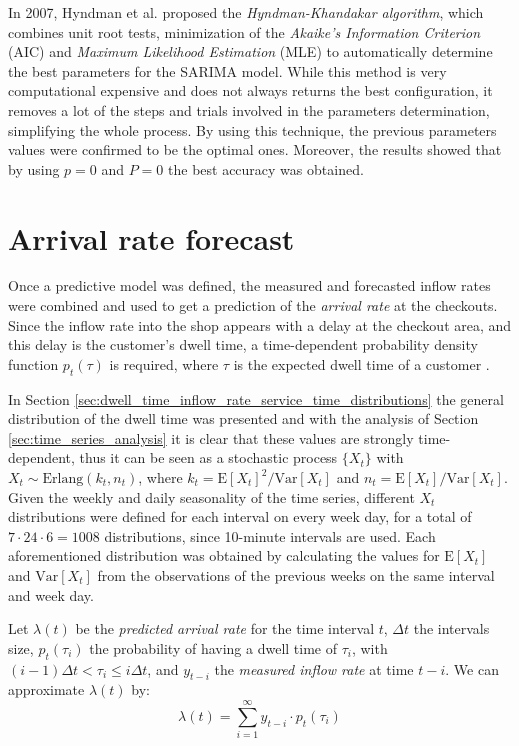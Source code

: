 In 2007, Hyndman et al. \cite{hyndman2007} proposed the \emph{Hyndman-Khandakar algorithm}, which combines unit root tests, minimization of the \emph{Akaike’s Information Criterion} (AIC) and \emph{Maximum Likelihood Estimation} (MLE) to automatically determine the best parameters for the SARIMA model. While this method is very computational expensive and does not always returns the best configuration, it removes a lot of the steps and trials involved in the parameters determination, simplifying the whole process. By using this technique, the previous parameters values were confirmed to be the optimal ones. Moreover, the results showed that by using \( p = 0 \) and \( P = 0 \) the best accuracy was obtained.

\section{Arrival rate forecast}
\label{sec:arrival_rate_forecast}

Once a predictive model was defined, the measured and forecasted inflow rates were combined and used to get a prediction of the \emph{arrival rate} at the checkouts. Since the inflow rate into the shop appears with a delay at the checkout area, and this delay is the customer's dwell time, a time-dependent probability density function \( p_t(\tau) \) is required, where \( \tau \) is the expected dwell time of a customer \cite{aksu}.

In Section \ref{sec:dwell_time_inflow_rate_service_time_distributions} the general distribution of the dwell time was presented and with the analysis of Section \ref{sec:time_series_analysis} it is clear that these values are strongly time-dependent, thus it can be seen as a stochastic process \( \{ X_t \} \) with \( X_t \sim \text{Erlang}(k_t, n_t) \), where \( k_t = \text{E}[X_t]^2 / \text{Var}[X_t] \) and \( n_t =  \text{E}[X_t] / \text{Var}[X_t] \). Given the weekly and daily seasonality of the time series, different \( X_t \) distributions were defined for each interval on every week day, for a total of \( 7 \cdot 24 \cdot 6 = 1008 \) distributions, since 10-minute intervals are used. Each aforementioned distribution was obtained by calculating the values for \( \text{E}[X_t] \) and \( \text{Var}[X_t] \) from the observations of the previous weeks on the same interval and week day.

Let \( \lambda(t) \) be the \emph{predicted arrival rate} for the time interval \( t \), \( \Delta t \) the intervals size, \( p_t(\tau_i) \) the probability of having a dwell time of \( \tau_i \), with \( (i-1) \Delta t < \tau_i \leq i \Delta t \), and \( y_{t-i} \) the \emph{measured inflow rate} at time \( t-i \). We can approximate \( \lambda(t) \) by:
\begin{equation}
  \lambda(t) = \sum_{i=1}^{\infty} y_{t-i} \cdot p_t(\tau_i)
\end{equation}


